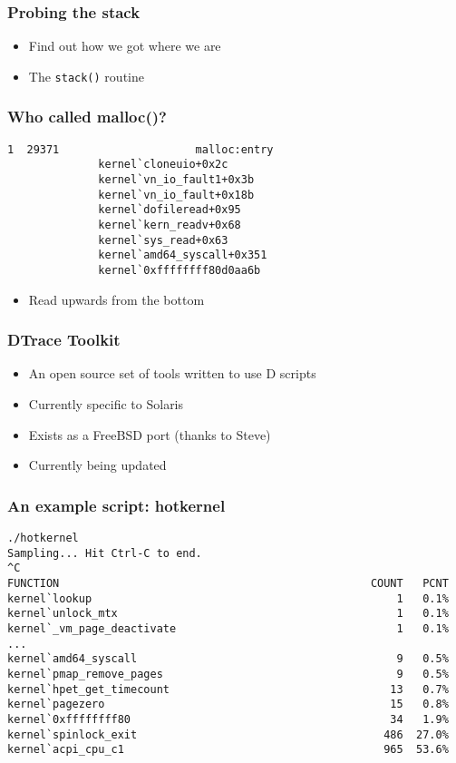 \documentclass[pdftex]{beamer}
\begin{document}
\begin{frame}[fragile]
  \frametitle{Probing the stack}
  \begin{itemize}
  \item Find out how we got where we are
  \item The \verb+stack()+ routine
  \end{itemize}
\end{frame}

\begin{frame}[fragile]
  \frametitle{Who called malloc()?}
\begin{lstlisting}
1  29371                     malloc:entry 
              kernel`cloneuio+0x2c
              kernel`vn_io_fault1+0x3b
              kernel`vn_io_fault+0x18b
              kernel`dofileread+0x95
              kernel`kern_readv+0x68
              kernel`sys_read+0x63
              kernel`amd64_syscall+0x351
              kernel`0xffffffff80d0aa6b
\end{lstlisting}
  \begin{itemize}
  \item Read upwards from the bottom
  \end{itemize}
\end{frame}

\begin{frame}
  \frametitle{DTrace Toolkit}
  \begin{itemize}
  \item An open source set of tools written to use D scripts
  \item Currently specific to Solaris
  \item Exists as a FreeBSD port (thanks to Steve)
  \item Currently being updated
  \end{itemize}
\end{frame}

\begin{frame}[fragile]
  \frametitle{An example script: hotkernel}
\begin{lstlisting}
./hotkernel 
Sampling... Hit Ctrl-C to end.
^C
FUNCTION                                                COUNT   PCNT
kernel`lookup                                               1   0.1%
kernel`unlock_mtx                                           1   0.1%
kernel`_vm_page_deactivate                                  1   0.1%
...
kernel`amd64_syscall                                        9   0.5%
kernel`pmap_remove_pages                                    9   0.5%
kernel`hpet_get_timecount                                  13   0.7%
kernel`pagezero                                            15   0.8%
kernel`0xffffffff80                                        34   1.9%
kernel`spinlock_exit                                      486  27.0%
kernel`acpi_cpu_c1                                        965  53.6%
\end{lstlisting}
\end{frame}
\end{document}
